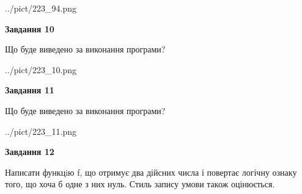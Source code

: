 \documentclass[12pt, ukrainian]{article}
\begin{document}
{\begin {large}
\begin{center}
	{../pict/223_94.png}
\end{center}
\newpage

{\begin {center}\textbf{Завдання 10}\end {center}}

Що буде виведено за виконання програми?\par
\begin{center}
	{../pict/223_10.png}
\end{center}
\newpage

{\begin {center}\textbf{Завдання 11}\end {center}}

Що буде виведено за виконання програми?\par
\begin{center}
	{../pict/223_11.png}
\end{center}
\newpage

{\begin {center}\textbf{Завдання 12}\end {center}}


Написати функцiю f, що отримує два дійсних числа і повертає логічну ознаку того, що хоча б одне з них нуль. Стиль запису умови також оцінюється.\par
\newpage

\end {large}}
\end{document}
